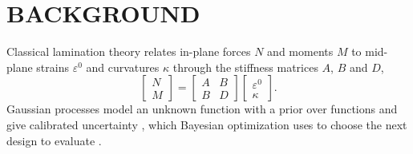 \chapter{BACKGROUND}
\label{ch:background}

Classical lamination theory relates in-plane forces $N$ and moments $M$ to mid-plane strains
$\varepsilon^0$ and curvatures $\kappa$ through the stiffness matrices $A$, $B$ and $D$,
\begin{equation}
  \begin{bmatrix} N \\ M \end{bmatrix} =
  \begin{bmatrix} A & B \\ B & D \end{bmatrix}
  \begin{bmatrix} \varepsilon^0 \\ \kappa \end{bmatrix} .
  \label{eq:clt}
\end{equation}
Gaussian processes model an unknown function with a prior over functions and give calibrated
uncertainty \citep{rasmussen2006}, which Bayesian optimization uses to choose the next design
to evaluate \citep{jones1998}.
